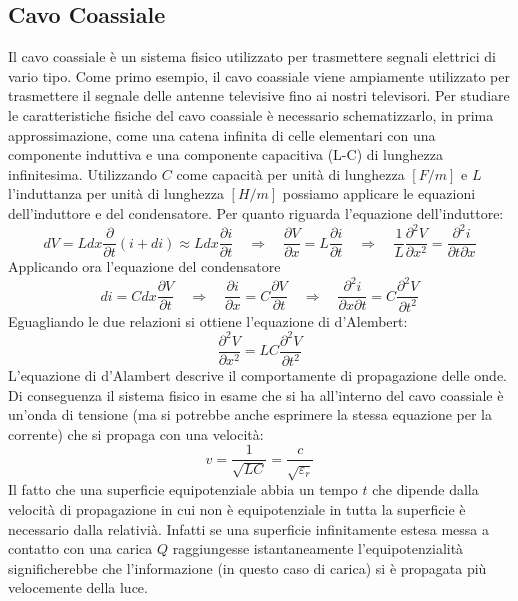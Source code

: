 \documentclass[11pt]{article}
\begin{document}
\subsection{Cavo Coassiale}
Il cavo coassiale è un sistema fisico utilizzato per trasmettere segnali elettrici di vario tipo. Come primo esempio, il cavo coassiale viene ampiamente utilizzato per trasmettere il segnale delle antenne televisive fino ai nostri televisori. Per studiare le caratteristiche fisiche del cavo coassiale è necessario schematizzarlo, in prima approssimazione, come una catena infinita di celle elementari con una componente induttiva e una componente capacitiva (L-C) di lunghezza infinitesima. Utilizzando $C$ come capacità per unità di lunghezza $[F/m]$ e $L$ l'induttanza per unità di lunghezza $[H/m]$ possiamo applicare le equazioni dell'induttore e del condensatore. Per quanto riguarda l'equazione dell'induttore:
\begin{equation}
    dV=Ldx\frac{\partial }{\partial t}(i+di)\approx Ldx\frac{\partial i}{\partial t} \quad \Rightarrow \quad \frac{\partial V}{\partial x}=L\frac{\partial i}{\partial t} \quad \Rightarrow \quad \frac{1}{L}\frac{\partial^2V}{\partial x^2}=\frac{\partial ^2i}{\partial t\partial x}
    \label{V}
\end{equation}
Applicando ora l'equazione del condensatore
\begin{equation}
    di=Cdx\frac{\partial V}{\partial t} \quad \Rightarrow \quad \frac{\partial i}{\partial x}=C\frac{\partial V}{\partial t}\quad \Rightarrow \quad \frac{\partial^2i}{\partial x\partial t}=C\frac{\partial^2V}{\partial t^2}
    \label{i}
\end{equation}
Eguagliando le due relazioni si ottiene l'equazione di d'Alembert:
\begin{equation}
    \frac{\partial^2V}{\partial x^2}=LC\frac{\partial^2V}{\partial t^2}
\end{equation}
L'equazione di d'Alambert descrive il comportamente di propagazione delle onde. Di conseguenza il sistema fisico in esame che si ha all'interno del cavo coassiale è un'onda di tensione (ma si potrebbe anche esprimere la stessa equazione per la corrente) che si propaga con una velocità:
\begin{equation}
    v=\frac{1}{\sqrt{LC}}=\frac{c}{\sqrt{\varepsilon_r}}
    \label{v}
\end{equation}
Il fatto che una superficie equipotenziale abbia un tempo $t$ che dipende dalla velocità di propagazione in cui non è equipotenziale in tutta la superficie è necessario dalla relativià. Infatti se una superficie infinitamente estesa messa a contatto con una carica $Q$ raggiungesse istantaneamente l'equipotenzialità significherebbe che l'informazione (in questo caso di carica) si è propagata più velocemente della luce. 
\end{document}
